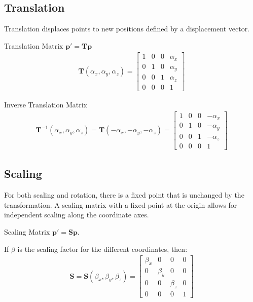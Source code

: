 \documentclass[../COS3712_Notes.tex]{subfiles}
\begin{document}
      \subsection{Translation}
        Translation displaces points to new positions defined by a displacement vector.

        \begin{theorem}{Translation Matrix}
          $\mathbf{p}' = \mathbf{Tp}$
          \begin{align*}
            \mathbf{T}(\alpha_x, \alpha_y, \alpha_z) = \begin{bmatrix}
              1 & 0 & 0 & \alpha_x \\
              0 & 1 & 0 & \alpha_y \\
              0 & 0 & 1 & \alpha_z \\
              0 & 0 & 0 & 1
            \end{bmatrix}
          \end{align*}
        \end{theorem}

        \begin{theorem}{Inverse Translation Matrix}
          \begin{align*}
            \mathbf{T}^{-1}(\alpha_x, \alpha_y, \alpha_z) = \mathbf{T}(-\alpha_x, -\alpha_y, -\alpha_z)
              = \begin{bmatrix}
                1 & 0 & 0 & -\alpha_x \\
                0 & 1 & 0 & -\alpha_y \\
                0 & 0 & 1 & -\alpha_z \\
                0 & 0 & 0 & 1
              \end{bmatrix}
          \end{align*}
        \end{theorem}

      \subsection{Scaling}
        For both scaling and rotation, there is a fixed point that is unchanged by the
        transformation.
        A scaling matrix with a fixed point at the origin allows for independent scaling
        along the coordinate axes.

        \begin{theorem}{Scaling Matrix}
          $\mathbf{p}' = \mathbf{Sp}$.

          If $\beta$ is the scaling factor for the different coordinates, then:
          \begin{align*}
            \mathbf{S} = \mathbf{S}(\beta_x, \beta_y, \beta_z)
            = \begin{bmatrix}
              \beta_x & 0 & 0 & 0 \\
              0 & \beta_y & 0 & 0 \\
              0 & 0 & \beta_z & 0 \\
              0 & 0 & 0 & 1
            \end{bmatrix}
          \end{align*}
        \end{theorem}
\end{document}
